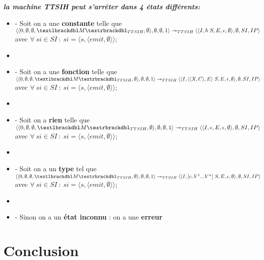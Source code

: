 \documentclass[10pt,a4paper]{report}
\begin{document}
	
	\textbf{\textit{la machine TTSIH peut s'arrêter dans 4 états différents:}}
	\smallbreak
	\begin{itemize}
		\item[] - Soit on a une \textbf{constante} telle que 
		$\langle\langle 0,\emptyset,\emptyset,\textlbrackdbl M\textrbrackdbl_{TTSIH},\emptyset\rangle,\emptyset,\emptyset,1\rangle 
		\twoheadrightarrow_{TTSIH} 
		\langle\langle I,b~S,E,\epsilon,\emptyset\rangle,\emptyset,SI,IP\rangle$
		\\ avec $\forall~si \in SI~:~si = \langle s,\langle emit,\emptyset\rangle\rangle$;
		\item[] 
		\item[] - Soit on a une \textbf{fonction} telle que
		$\langle\langle 0,\emptyset,\emptyset,\textlbrackdbl M\textrbrackdbl_{TTSIH},\emptyset\rangle,\emptyset,\emptyset,1\rangle 
		\twoheadrightarrow_{TTSIH} 
		\langle\langle I,\langle\langle X,C\rangle,E\rangle~S,E,\epsilon,\emptyset\rangle,\emptyset,SI,IP\rangle$
		\\ avec $\forall~si \in SI~:~si = \langle s,\langle emit,\emptyset\rangle\rangle$;
		\item[] 
		\item[] - Soit on a \textbf{rien} telle que  
		$\langle\langle 0,\emptyset,\emptyset,\textlbrackdbl M\textrbrackdbl_{TTSIH},\emptyset\rangle,\emptyset,\emptyset,1\rangle 
		\twoheadrightarrow_{TTSIH} 
		\langle\langle I,\epsilon,E,\epsilon,\emptyset\rangle,\emptyset,SI,IP\rangle$
		\\ avec $\forall~si \in SI~:~si = \langle s,\langle emit,\emptyset\rangle\rangle$;
		\item[]
		\item[] - Soit on a un \textbf{type} tel que  
		$\langle\langle 0,\emptyset,\emptyset,\textlbrackdbl M\textrbrackdbl_{TTSIH},\emptyset\rangle,\emptyset,\emptyset,1\rangle 
		\twoheadrightarrow_{TTSIH} 
		\langle\langle I,[c,V^{1}...V^{n}]~S,E,\epsilon,\emptyset\rangle,\emptyset,SI,IP\rangle$
		\\ avec $\forall~si \in SI~:~si = \langle s,\langle emit,\emptyset\rangle\rangle$;
		\item[]
		\item[] - Sinon on a un \textbf{état inconnu} : on a une \textbf{erreur} 
	\end{itemize}
	\bigbreak
	
	
	
	\chapter{Conclusion}
	
\end{document}

